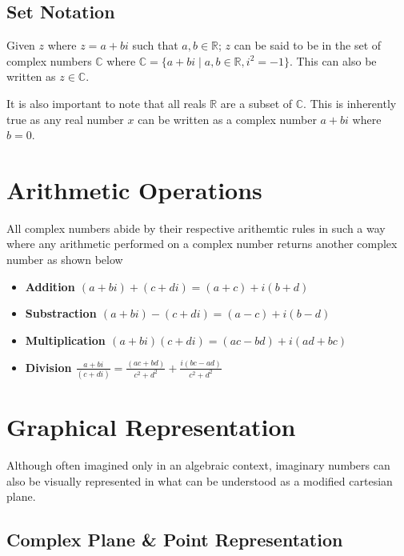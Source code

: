 \documentclass[12pt]{article}
\newcommand{\C}{{\mathbb{C}}}
\newcommand{\R}{{\mathbb{R}}}
\begin{document}
    \subsection{Set Notation}


    Given $z$ where $z = a + bi$ such that $a, b \in\R$; $z$ can be said to be in the set of
    complex numbers $\C$ where $\C = \{a + bi \mid a, b\in\R, i^2 = -1\}$. This can also be written
    as $z\in\C$. 

    It is also important to note that all reals $\R$ are a subset of $\C$. This is inherently 
    true as any real number $x$ can be written as a complex number $a + bi$ where $b = 0$. 

    \section{Arithmetic Operations}

    All complex numbers abide by their respective arithemtic rules in such a way 
    where any arithmetic performed on a complex number returns another complex number 
    as shown below

    \begin{itemize}
        
        \item \bf Addition 
            $(a + bi) + (c + di) = (a + c) + i(b + d)$
        \item \bf Substraction 
            $(a + bi) - (c + di) = (a - c) + i(b - d)$
        \item \bf Multiplication
            $(a + bi)(c + di) = (ac - bd) + i(ad + bc)$
        \item \bf Division
            $\frac{a + bi}{(c + di)} = \frac{(ac + bd)}{c^2 + d^2} + \frac{i(bc - ad)}{c^2 + d^2}$

    \end{itemize}

    \section{Graphical Representation}

    Although often imagined only in an algebraic context, imaginary numbers can also be visually represented 
    in what can be understood as a modified cartesian plane. 

    \subsection{Complex Plane \& Point Representation}
\end{document}
